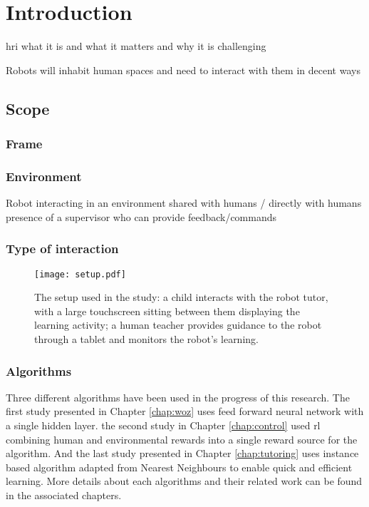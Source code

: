 \chapter{Introduction} \label{chap:intro}

\gls{hri} what it is and what it matters and why it is challenging

Robots will inhabit human spaces and need to interact with them in decent ways

\section{Scope}\label{sec:intro-scope}

\subsection{Frame}

\subsection{Environment} \label{sec:scope-social}
Robot interacting in an environment shared with humans / directly with humans
presence of a supervisor who can provide feedback/commands

\subsection{Type of interaction}

\begin{figure}[ht]
	\texttt{[image: setup.pdf]}
	\centering
	\caption{The setup used in the study: a child interacts with the robot tutor, with a large touchscreen sitting between them displaying the learning activity; a human teacher provides guidance to the robot through a tablet and monitors the robot's learning.}
	\label{fig:setup}
\end{figure}

\subsection{Algorithms}

Three different algorithms have been used in the progress of this research. The first study presented in Chapter \ref{chap:woz} uses feed forward neural network with a single hidden layer. the second study in Chapter \ref{chap:control} used \acrlong{rl} combining human and environmental rewards into a single reward source for the algorithm. And the last study presented in Chapter \ref{chap:tutoring} uses instance based algorithm adapted from Nearest Neighbours to enable quick and efficient learning. More details about each algorithms and their related work can be found in the associated chapters.

